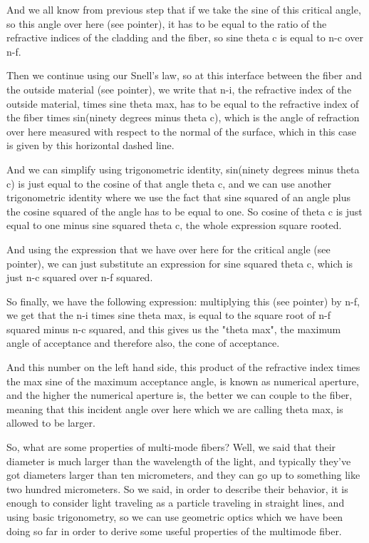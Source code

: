And we all know from previous step that if we take the sine of this critical angle, so this angle over here (see pointer), it has to be equal to the ratio of the refractive indices of the cladding and the fiber, so sine theta c is equal to n-c over n-f.

Then we continue using our Snell's law, so at this interface between the fiber and the outside material (see pointer), we write that n-i, the refractive index of the outside material, times sine theta max, has to be equal to the refractive index of the fiber times sin(ninety degrees minus theta c), which is the angle of refraction over here measured with respect to the normal of the surface, which in this case is given by this horizontal dashed line.

And we can simplify using trigonometric identity, sin(ninety degrees minus theta c) is just equal to the cosine of that angle theta c, and we can use another trigonometric identity where we use the fact that sine squared of an angle plus the cosine squared of the angle has to be equal to one. So cosine of theta c is just equal to one minus sine squared theta c, the whole expression square rooted.

And using the expression that we have over here for the critical angle (see pointer), we can just substitute an expression for sine squared theta c, which is just n-c squared over n-f squared.

So finally, we have the following expression: multiplying this (see pointer) by n-f, we get that the n-i times sine theta max, is equal to the square root of n-f squared minus n-c squared, and this gives us the "theta max", the maximum angle of acceptance and therefore also, the cone of acceptance.

And this number on the left hand side, this product of the refractive index times the max sine of the maximum acceptance angle, is known as numerical aperture, and the higher the numerical aperture is, the better we can couple to the fiber, meaning that this incident angle over here which we are calling theta max, is allowed to be larger.

So, what are some properties of multi-mode fibers? Well, we said that their diameter is much larger than the wavelength of the light, and typically they've got diameters larger than ten micrometers, and they can go up to something like two hundred micrometers. So we said, in order to describe their behavior, it is enough to consider light traveling as a particle traveling in straight lines, and using basic trigonometry, so we can use geometric optics which we have been doing so far in order to derive some useful properties of the multimode fiber.


